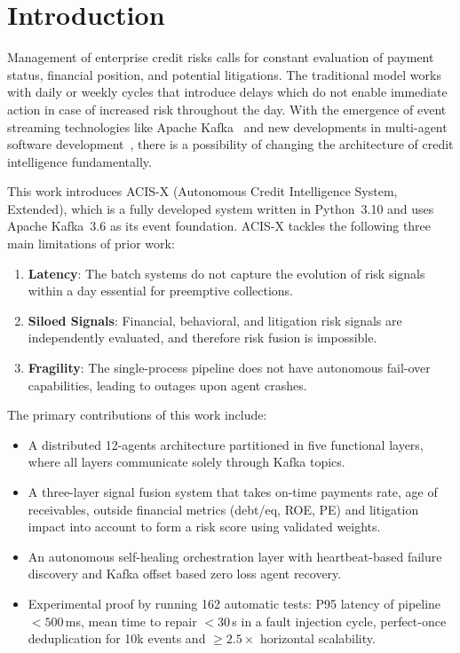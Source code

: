 ﻿\documentclass[runningheads]{llncs}
\begin{document}

\section{Introduction}
\label{sec:intro}

Management of enterprise credit risks calls for constant evaluation of payment status, financial position, and potential litigations. The traditional model works with daily or weekly cycles that introduce delays which do not enable immediate action in case of increased risk throughout the day. With the emergence of event streaming technologies like Apache Kafka~\cite{kreps2011kafka} and new developments in multi-agent software development~\cite{zhang2024event}, there is a possibility of changing the architecture of credit intelligence fundamentally.

This work introduces ACIS-X (Autonomous Credit Intelligence System, Extended), which is a fully developed system written in Python~3.10 and uses Apache Kafka~3.6 as its event foundation. ACIS-X tackles the following three main limitations of prior work:

\begin{enumerate}
    \item \textbf{Latency}: The batch systems do not capture the evolution of risk signals within a day essential for preemptive collections.
    \item \textbf{Siloed Signals}: Financial, behavioral, and litigation risk signals are independently evaluated, and therefore risk fusion is impossible.
    \item \textbf{Fragility}: The single-process pipeline does not have autonomous fail-over capabilities, leading to outages upon agent crashes.
\end{enumerate}

The primary contributions of this work include:
\begin{itemize}
    \item A distributed 12-agents architecture partitioned in five functional layers, where all layers communicate solely through Kafka topics.
    \item A three-layer signal fusion system that takes on-time payments rate, age of receivables, outside financial metrics (debt/eq, ROE, PE) and litigation impact into account to form a risk score using validated weights.
    \item An autonomous self-healing orchestration layer with heartbeat-based failure discovery and Kafka offset based zero loss agent recovery.
    \item Experimental proof by running 162 automatic tests: P95 latency of pipeline $<500$\,ms, mean time to repair $<30$\,s in a fault injection cycle, perfect-once deduplication for 10k events and $\geq2.5\times$ horizontal scalability.
\end{itemize}
\end{document}
